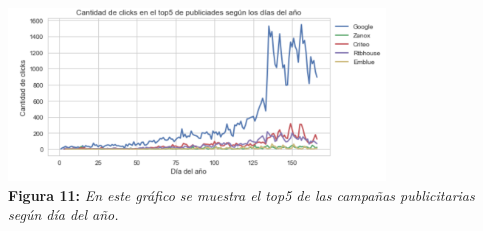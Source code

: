 \documentclass[titlepage,a4paper]{article}
\begin{document}
	\begin{center}
	\includegraphics[width=10cm] {cantidadDeClicksSegunDiaDelAnio.jpg}\\
	\textbf{Figura 11:}  \textit{En este gráfico se muestra el top5 de las campañas publicitarias según día del año.  }
	\end{center}

	
	
	
\end{document}
